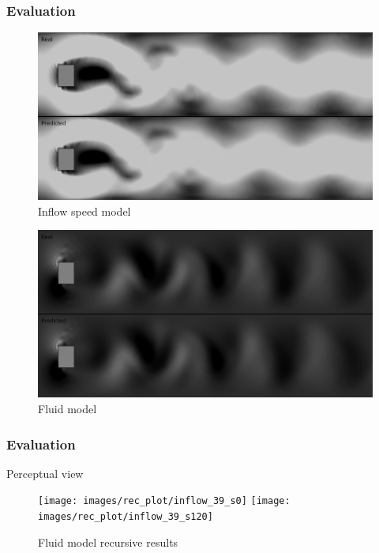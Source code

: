 \documentclass[18pt, xcolor=table]{beamer}
\begin{document}
\begin{frame}[t]
  \frametitle{Evaluation}
  \begin{center}
    \begin{figure}[htb]
      \includegraphics[scale=0.15]{images/flows/x_speed_good}
      \vspace{-0.2cm}
      \caption{Inflow speed model}
    \end{figure}
    \begin{figure}[htb]
      \includegraphics[scale=0.15]{images/flows/y_fluid_good}
      \vspace{-0.2cm}
      \caption{Fluid model}
    \end{figure}
  \end{center}
\end{frame}

\begin{frame}[t]
  \frametitle{Evaluation}
  \large{Perceptual view}
  \begin{center}
    \begin{figure}[htb]
      \texttt{[image: images/rec\_plot/inflow\_39\_s0]}
      \texttt{[image: images/rec\_plot/inflow\_39\_s120]}
      \caption{Fluid model recursive results}
    \end{figure}
  \end{center}
\end{frame}
\end{document}
